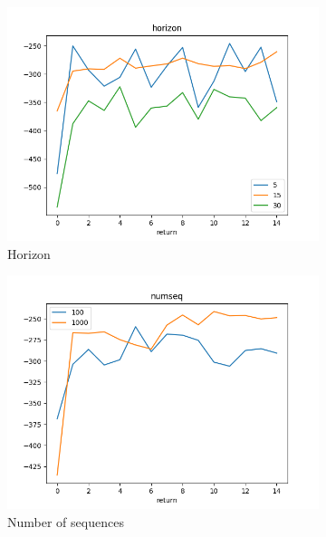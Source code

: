 \begin{figure}[htbp]
    \begin{subfigure}[b]{0.3\linewidth}
        \centering
        \includegraphics[width=1.0\linewidth]{figures/p4-ho.png}
        \caption{Horizon}
    \end{subfigure}
    \begin{subfigure}[b]{0.3\linewidth}
        \centering
        \includegraphics[width=1.0\linewidth]{figures/p4-nu.png}
        \caption{Number of sequences}
    \end{subfigure}
    \begin{subfigure}[b]{0.3\linewidth}
        \centering

\end{subfigure}
\end{figure}
